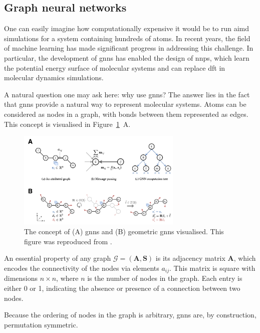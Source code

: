 \subsection{Graph neural networks}
One can easily imagine how computationally expensive it would be to run \ac{aimd} simulations for a system containing hundreds of atoms. In recent years, the field of machine learning has made significant progress in addressing this challenge. In particular, the development of \acp{gnn} has enabled the design of \acp{nnp}, which learn the potential energy surface of molecular systems and can replace \ac{dft} in molecular dynamics simulations.

A natural question one may ask here: why use \acp{gnn}? The answer lies in the fact that \acp{gnn} provide a natural way to represent molecular systems. Atoms can be considered as nodes in a graph, with bonds between them represented as edges. This concept is visualised in Figure~\ref{fig:graph_and_geometric_nns}~A.

\begin{figure}[t!]
    \centering
    \includegraphics[width=0.7\textwidth]{Figures/2_Theory/graph_and_geometric_nns.png}
    \caption{The concept of (A) \acp{gnn} and (B) geometric \acp{gnn} visualised. This figure was reproduced from \citep{duvalHitchhikersGuideGeometric2024}.}
    \label{fig:graph_and_geometric_nns}
\end{figure}

An essential property of any graph $\mathcal{G} = (\mathbf{A}, \mathbf{S})$ is its adjacency matrix $\mathbf{A}$, which encodes the connectivity of the nodes via elements $a_{ij}$. This matrix is square with dimensions $n \times n$, where $n$ is the number of nodes in the graph. Each entry is either 0 or 1, indicating the absence or presence of a connection between two nodes.

Because the ordering of nodes in the graph is arbitrary, \acp{gnn} are, by construction, permutation symmetric.


